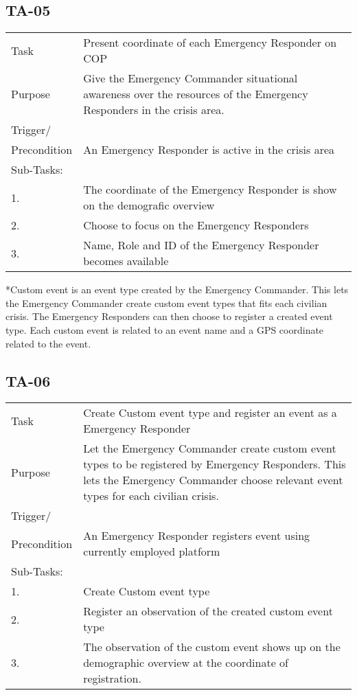 \newpage
\subsection{TA-05}
\begin{longtable}{| p{2.5cm}  | p{10cm} |  }
	\hline
	Task &  Present coordinate of each Emergency Responder on COP \\
	Purpose & Give the Emergency Commander situational awareness over the resources of the Emergency Responders in the crisis area. \\
	Trigger/ &  \\Precondition & An Emergency Responder is active in the crisis area\\
	\hline
	Sub-Tasks: & \\
	1. & The coordinate of the Emergency Responder is show on the demografic overview \\
	\hline
	2. & Choose to focus on the Emergency Responders \\
	\hline
	3. & Name, Role and ID of the Emergency Responder becomes available \\
	\hline
\end{longtable}

*Custom event is an event type created by the Emergency Commander. This lets the Emergency Commander create custom event types that fits each civilian crisis. The Emergency Responders can then choose to register a created event type. Each custom event is related to an event name and a GPS coordinate related to the event.


\subsection{TA-06}
\begin{longtable}{| p{2.5cm}  | p{10cm} |  }
	\hline
	Task & Create Custom event type and register an event as a Emergency Responder \\
	Purpose & Let the Emergency Commander create custom event types to be registered by Emergency Responders. This lets the Emergency Commander choose relevant event types for each civilian crisis.  \\
	Trigger/ &  \\Precondition & An  Emergency Responder registers event using currently employed platform \\
	\hline
	Sub-Tasks: & \\
	1. & Create Custom event type \\
	2. & Register an observation of the created custom event type \\
	3. & The observation of the custom event shows up on the demographic overview at the coordinate of registration. \\
	\hline
\end{longtable}

